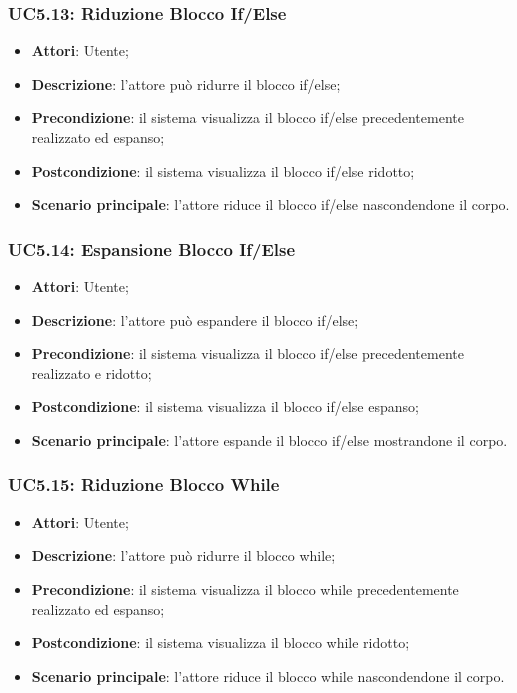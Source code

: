 \subsubsection{UC5.13: Riduzione Blocco If/Else}
\label{UC5.13}
\begin{itemize}
	\item \textbf{Attori}: Utente;
	\item \textbf{Descrizione}: l'attore può ridurre il blocco if/else;
	\item \textbf{Precondizione}: il sistema visualizza il blocco if/else precedentemente realizzato ed espanso;
	\item \textbf{Postcondizione}: il sistema visualizza il blocco if/else ridotto;
	\item \textbf{Scenario principale}: l'attore riduce il blocco if/else nascondendone il corpo.
\end{itemize}

\subsubsection{UC5.14: Espansione Blocco If/Else}
\label{UC5.14}
\begin{itemize}
	\item \textbf{Attori}: Utente;
	\item \textbf{Descrizione}: l'attore può espandere il blocco if/else;
	\item \textbf{Precondizione}: il sistema visualizza il blocco if/else precedentemente realizzato e ridotto;
	\item \textbf{Postcondizione}: il sistema visualizza il blocco if/else espanso;
	\item \textbf{Scenario principale}: l'attore espande il blocco if/else mostrandone il corpo.
\end{itemize}

\subsubsection{UC5.15: Riduzione Blocco While}
\label{UC5.15}
\begin{itemize}
	\item \textbf{Attori}: Utente;
	\item \textbf{Descrizione}: l'attore può ridurre il blocco while;
	\item \textbf{Precondizione}: il sistema visualizza il blocco while precedentemente realizzato ed espanso;
	\item \textbf{Postcondizione}: il sistema visualizza il blocco while ridotto;
	\item \textbf{Scenario principale}: l'attore riduce il blocco while nascondendone il corpo.
\end{itemize}

